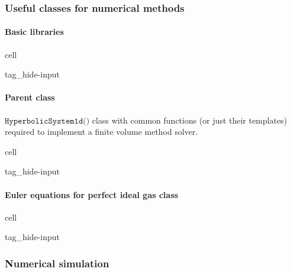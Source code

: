 \documentclass[letterpaper,10pt,english]{jupyterBook}
\begin{document}
\sphinxAtStartPar
{}


\subsubsection{Useful classes for numerical methods}
\label{\detokenize{ch/pde/euler-quasi-1d:useful-classes-for-numerical-methods}}

\paragraph{Basic libraries}
\label{\detokenize{ch/pde/euler-quasi-1d:basic-libraries}}
\begin{sphinxuseclass}{cell}
\begin{sphinxuseclass}{tag_hide-input}
\end{sphinxuseclass}
\end{sphinxuseclass}

\paragraph{Parent class}
\label{\detokenize{ch/pde/euler-quasi-1d:parent-class}}
\sphinxAtStartPar
\(\texttt{HyperbolicSystem1d()}\) class with common functions (or just their templates) required to implement a finite volume method solver.

\begin{sphinxuseclass}{cell}
\begin{sphinxuseclass}{tag_hide-input}
\end{sphinxuseclass}
\end{sphinxuseclass}

\paragraph{Euler equations for perfect ideal gas class}
\label{\detokenize{ch/pde/euler-quasi-1d:euler-equations-for-perfect-ideal-gas-class}}
\begin{sphinxuseclass}{cell}
\begin{sphinxuseclass}{tag_hide-input}
\end{sphinxuseclass}
\end{sphinxuseclass}

\subsubsection{Numerical simulation}
\label{\detokenize{ch/pde/euler-quasi-1d:numerical-simulation}}
\end{document}
